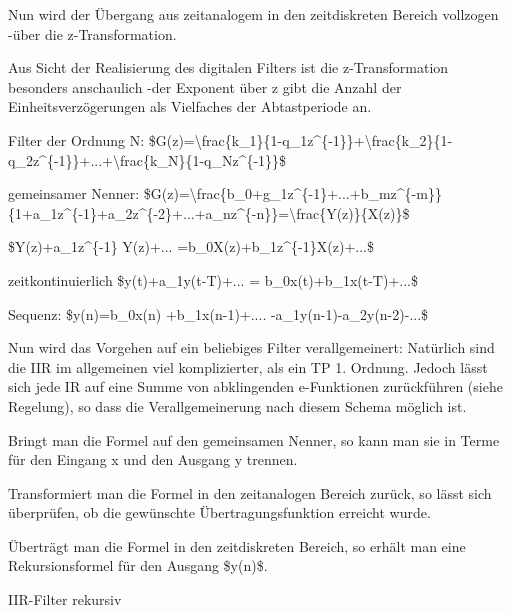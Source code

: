 \documentclass[a4paper]{article}
\begin{document}
\begin{multicols}{3}
\begin{itemize*}
    \item Nun wird der Übergang aus zeitanalogem in den zeitdiskreten Bereich vollzogen -über die z-Transformation.
    \item Aus Sicht der Realisierung des digitalen Filters ist die z-Transformation besonders anschaulich -der Exponent über z gibt die Anzahl der Einheitsverzögerungen als Vielfaches der Abtastperiode an.
    \item Filter der Ordnung N: \$G(z)=\textbackslash frac\{k\_1\}\{1-q\_1z\^{}\{-1\}\}+\textbackslash frac\{k\_2\}\{1-q\_2z\^{}\{-1\}\}+...+\textbackslash frac\{k\_N\}\{1-q\_Nz\^{}\{-1\}\}\$
    \item gemeinsamer Nenner: \$G(z)=\textbackslash frac\{b\_0+g\_1z\^{}\{-1\}+...+b\_mz\^{}\{-m\}\}\{1+a\_1z\^{}\{-1\}+a\_2z\^{}\{-2\}+...+a\_nz\^{}\{-n\}\}=\textbackslash frac\{Y(z)\}\{X(z)\}\$
    \item \$Y(z)+a\_1z\^{}\{-1\} Y(z)+... =b\_0X(z)+b\_1z\^{}\{-1\}X(z)+...\$
    \item zeitkontinuierlich \$y(t)+a\_1y(t-T)+... = b\_0x(t)+b\_1x(t-T)+...\$
    \item Sequenz: \$y(n)=b\_0x(n) +b\_1x(n-1)+.... -a\_1y(n-1)-a\_2y(n-2)-...\$
    \item Nun wird das Vorgehen auf ein beliebiges Filter verallgemeinert: Natürlich sind die IIR im allgemeinen viel komplizierter, als ein TP 1. Ordnung. Jedoch lässt sich jede IR auf eine Summe von abklingenden e-Funktionen zurückführen (siehe Regelung), so dass die Verallgemeinerung nach diesem Schema möglich ist.
    \item Bringt man die Formel auf den gemeinsamen Nenner, so kann man sie in Terme für den Eingang x und den Ausgang y trennen.
    \item Transformiert man die Formel in den zeitanalogen Bereich zurück, so lässt sich überprüfen, ob die gewünschte Übertragungsfunktion erreicht wurde.
    \item Überträgt man die Formel in den zeitdiskreten Bereich, so erhält man eine Rekursionsformel für den Ausgang \$y(n)\$.
  \end{itemize*}

  IIR-Filter rekursiv


\end{multicols}
\end{document}

